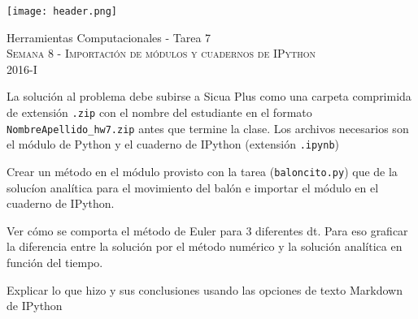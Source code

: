 \documentclass[11pt,letterpaper]{exam}
\begin{document}
\begin{center}

\texttt{[image: header.png]}

\vspace{1.0cm}
{\Large Herramientas Computacionales - Tarea 7} \\
\textsc{Semana 8 - Importaci\'on de m\'odulos y cuadernos de IPython}\\
2016-I\\
\end{center}



\vspace{0.5cm}

\noindent
La soluci\'on al problema debe subirse a Sicua Plus como una carpeta comprimida de extensi\'on \verb".zip" con el nombre del estudiante en el formato \verb"NombreApellido_hw7.zip" antes que termine la clase. Los archivos necesarios son el m\'odulo de Python y el cuaderno de IPython (extensi\'on \verb".ipynb")

\vspace{0.5cm}

\begin{questions}
 

Crear un m\'etodo en el m\'odulo provisto con la tarea (\verb"baloncito.py") que de la soluc\'ion anal\'itica para el movimiento del bal\'on e importar el m\'odulo en el cuaderno de IPython.


Ver c\'omo se comporta el m\'etodo de Euler para 3 diferentes dt. Para eso graficar la diferencia entre la soluci\'on por el m\'etodo num\'erico y la soluci\'on anal\'itica en funci\'on del tiempo. 


Explicar lo que hizo y sus conclusiones usando las opciones de texto Markdown de IPython


\end{questions}
\end{document}
